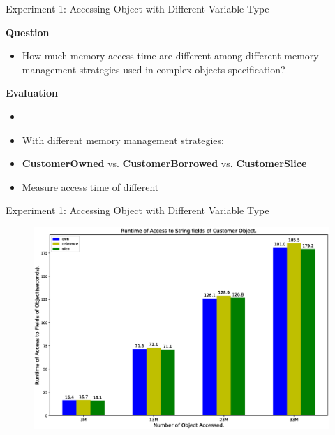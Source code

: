 \documentclass[9pt]{beamer}
\begin{document}

\begin{frame}[fragile]{Experiment 1: Accessing Object with Different Variable Type}

    \textbf{Question}
    \begin{itemize}
        \item How much memory access time are different among different memory management strategies used in complex objects specification?
    \end{itemize}

    \vspace{0.5cm}

    \textbf{Evaluation}
    \begin{itemize}
        \item {}
        \item With different memory management strategies: 
        \item \textbf{CustomerOwned} vs. \textbf{CustomerBorrowed} vs. \textbf{CustomerSlice}
        \item Measure access time of different 
    \end{itemize}

\end{frame}


\begin{frame}[t, fragile]{Experiment 1: Accessing Object with Different Variable Type}

    \begin{figure}[hp]
        \centering
        \begin{center}
                \includegraphics[width=1\textwidth]{images/rust_access_different_poniter_init.eps}
                \captionsetup{labelformat=empty}
        \end{center}
    \end{figure}
\end{frame}
\end{document}
